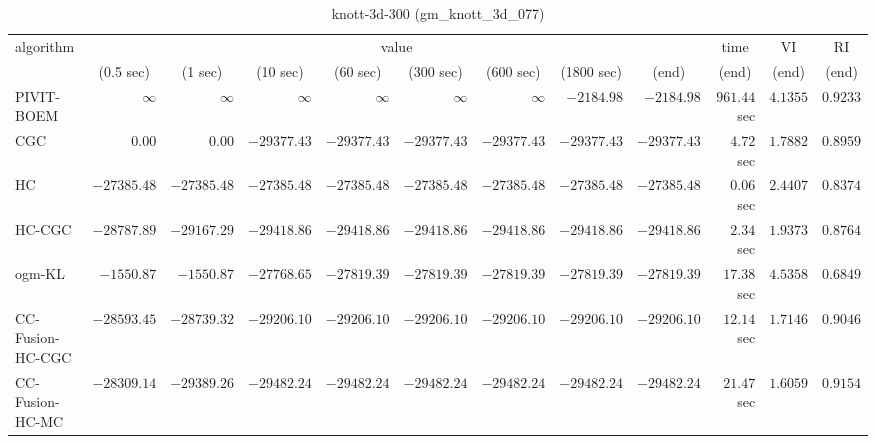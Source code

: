 \begin{table}[H]
\scriptsize
\centering
\caption{knott-3d-300 (gm\_knott\_3d\_077)}
\label{tab:anytimetable-knott-3d-300-gm-knott-3d-077}
\begin{tabular}{lrrrrrrrrrrr}
\toprule
           algorithm &                                   \multicolumn{8}{c}{value} & \multicolumn{1}{c}{time}    & \multicolumn{1}{c}{VI}  & \multicolumn{1}{c}{RI} \\  
\cmidrule(lr){2-9}\cmidrule(lr){10-10} \cmidrule(lr){11-11} \cmidrule(lr){12-12}   
                     & \multicolumn{1}{c}{(0.5 sec)} & \multicolumn{1}{c}{(1 sec)} & \multicolumn{1}{c}{(10 sec)} & \multicolumn{1}{c}{(60 sec)} & \multicolumn{1}{c}{(300 sec)} & \multicolumn{1}{c}{(600 sec)} & \multicolumn{1}{c}{(1800 sec)} & \multicolumn{1}{c}{(end)} & \multicolumn{1}{c}{(end)}    & \multicolumn{1}{c}{(end)}   & \multicolumn{1}{c}{(end)}  \\ \midrule 
          PIVIT-BOEM & $\infty$ & $\infty$ & $\infty$ & $\infty$ & $\infty$ & $\infty$ & $     -2184.98$ & $     -2184.98$ & $       961.44$ sec    & $       4.1355$  & $       0.9233$ \\ 
                 CGC & $         0.00$ & $         0.00$ & $    -29377.43$ & $    -29377.43$ & $    -29377.43$ & $    -29377.43$ & $    -29377.43$ & $    -29377.43$ & $         4.72$ sec    & $       1.7882$  & $       0.8959$ \\ 
                  HC & $    -27385.48$ & $    -27385.48$ & $    -27385.48$ & $    -27385.48$ & $    -27385.48$ & $    -27385.48$ & $    -27385.48$ & $    -27385.48$ & $         0.06$ sec    & $       2.4407$  & $       0.8374$ \\ 
              HC-CGC & $    -28787.89$ & $    -29167.29$ & $    -29418.86$ & $    -29418.86$ & $    -29418.86$ & $    -29418.86$ & $    -29418.86$ & $    -29418.86$ & $         2.34$ sec    & $       1.9373$  & $       0.8764$ \\ 
              ogm-KL & $     -1550.87$ & $     -1550.87$ & $    -27768.65$ & $    -27819.39$ & $    -27819.39$ & $    -27819.39$ & $    -27819.39$ & $    -27819.39$ & $        17.38$ sec    & $       4.5358$  & $       0.6849$ \\ 
    CC-Fusion-HC-CGC & $    -28593.45$ & $    -28739.32$ & $    -29206.10$ & $    -29206.10$ & $    -29206.10$ & $    -29206.10$ & $    -29206.10$ & $    -29206.10$ & $        12.14$ sec    & $       1.7146$  & $       0.9046$ \\ 
     CC-Fusion-HC-MC & $    -28309.14$ & $    -29389.26$ & $    -29482.24$ & $    -29482.24$ & $    -29482.24$ & $    -29482.24$ & $    -29482.24$ & $    -29482.24$ & $        21.47$ sec    & $       1.6059$  & $       0.9154$ \\ 

\end{tabular}
\end{table}
